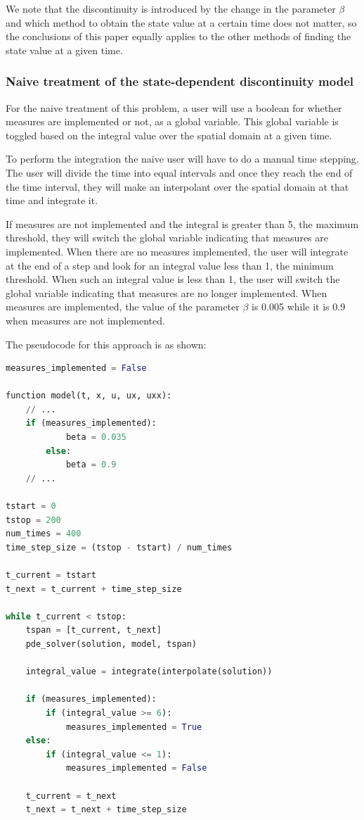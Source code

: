 \documentclass{article}
\begin{document}
We note that the discontinuity is introduced by the change in the parameter $\beta$ and which method to obtain the state value at a certain time does not matter, so the conclusions of this paper equally applies to the other methods of finding the state value at a given time.
 
\subsubsection{Naive treatment of the state-dependent discontinuity model}
\label{subsubsection:pde_state_naive}
For the naive treatment of this problem, a user will use a boolean for whether measures are implemented or not, as a global variable. This global variable is toggled based on the integral value over the spatial domain at a given time.  

To perform the integration the naive user will have to do a manual time stepping. The user will divide the time into equal intervals and once they reach the end of the time interval, they will make an interpolant over the spatial domain at that time and integrate it. 

If measures are not implemented and the integral is greater than 5, the maximum threshold, they will switch the global variable indicating that measures are implemented. When there are no measures implemented, the user will integrate at the end of a step and look for an integral value less than 1, the minimum threshold. When such an integral value is less than 1, the user will switch the global variable indicating that measures are no longer implemented. When measures are implemented, the value of the parameter $\beta$ is 0.005 while it is 0.9 when measures are not implemented. 

The pseudocode for this approach is as shown:

\begin{minipage}{\linewidth}
\begin{lstlisting}[language=Python]
measures_implemented = False

function model(t, x, u, ux, uxx):
    // ...
    if (measures_implemented):
    		beta = 0.035
    	else:
    		beta = 0.9
    // ...

tstart = 0
tstop = 200
num_times = 400
time_step_size = (tstop - tstart) / num_times
		
t_current = tstart
t_next = t_current + time_step_size

while t_current < tstop:
	tspan = [t_current, t_next]
	pde_solver(solution, model, tspan)
	
	integral_value = integrate(interpolate(solution))
	
	if (measures_implemented):
		if (integral_value >= 6):
			measures_implemented = True
	else:
		if (integral_value <= 1):
			measures_implemented = False
	
	t_current = t_next
	t_next = t_next + time_step_size
\end{lstlisting}
\end{minipage}
\end{document}
